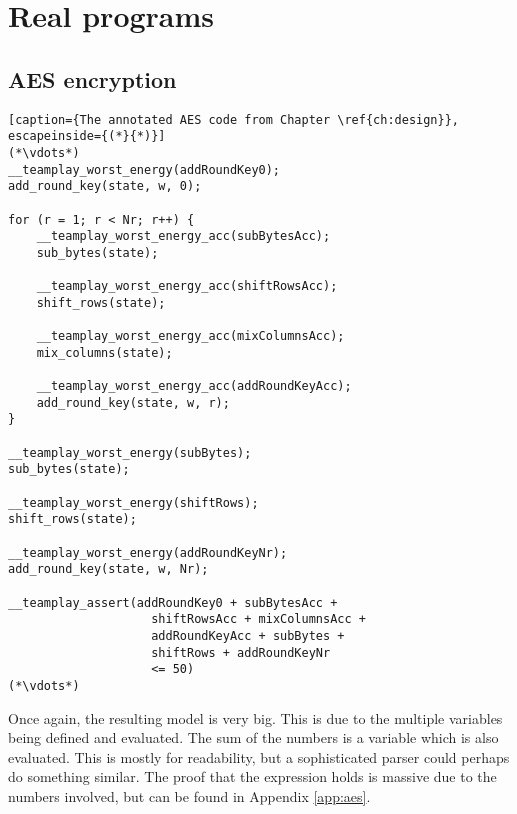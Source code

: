 \section{Real programs}\label{evaln:real-progs}
    \subsection{AES encryption}\label{evaln:real}
        \begin{lstlisting}[caption={The annotated AES code from Chapter \ref{ch:design}}, escapeinside={(*}{*)}]
(*\vdots*)
__teamplay_worst_energy(addRoundKey0);
add_round_key(state, w, 0);

for (r = 1; r < Nr; r++) {
    __teamplay_worst_energy_acc(subBytesAcc);
    sub_bytes(state);
    
    __teamplay_worst_energy_acc(shiftRowsAcc);
    shift_rows(state);
    
    __teamplay_worst_energy_acc(mixColumnsAcc);
    mix_columns(state);
    
    __teamplay_worst_energy_acc(addRoundKeyAcc);
    add_round_key(state, w, r);
}

__teamplay_worst_energy(subBytes);
sub_bytes(state);

__teamplay_worst_energy(shiftRows);
shift_rows(state);

__teamplay_worst_energy(addRoundKeyNr);
add_round_key(state, w, Nr);

__teamplay_assert(addRoundKey0 + subBytesAcc +
                    shiftRowsAcc + mixColumnsAcc +
                    addRoundKeyAcc + subBytes +
                    shiftRows + addRoundKeyNr
                    <= 50)
(*\vdots*)
        \end{lstlisting}
        
        
        Once again, the resulting \Idris model is very big. This is due to the multiple variables being defined and evaluated. The sum of the numbers is a variable which is also evaluated. This is mostly for readability, but a sophisticated parser could perhaps do something similar. The proof that the expression holds is massive due to the numbers involved, but can be found in Appendix \ref{app:aes}.
